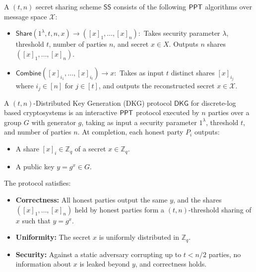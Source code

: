 \begin{definition}
A $(t,n)$ secret sharing scheme $\mathsf{SS}$ consists of the following $\mathsf{PPT}$ algorithms over message space $\mathcal{X}$:
\begin{itemize}
    \item $\mathsf{Share}(1^{\lambda}, t, n, x) \to ([x]_1, \dots, [x]_n):$ Takes security parameter $\lambda$, threshold $t$, number of parties $n$, and secret $x \in X$. Outputs $n$ shares $([x]_1, \dots, [x]_n)$.
    
    \item $\mathsf{Combine}([x]_{i_1}, \dots, [x]_{i_t}) \to x:$ Takes as input $t$ distinct shares $[x]_{i_j}$ where $i_j \in [n]$ for $j \in [t]$, and outputs the reconstructed secret $x \in \mathcal{X}$.
\end{itemize}
\end{definition}




\begin{definition}
A $(t,n)$-Distributed Key Generation (DKG) protocol $\mathsf{DKG}$ for discrete-log based cryptosystems is an interactive $\mathsf{PPT}$ protocol executed by $n$ parties over a group $G$ with generator $g$, taking as input a security parameter $1^\lambda$, threshold $t$, and number of parties $n$. At completion, each honest party $P_i$ outputs:
\begin{itemize}
    \item A share $[x]_i \in \mathbb{Z}_q$ of a secret $x \in \mathbb{Z}_q$.
    \item A public key $y = g^x \in G$.
\end{itemize}
The protocol satisfies:
\begin{itemize}
    \item \textbf{Correctness:} All honest parties output the same $y$, and the shares $([x]_1, \dots, [x]_n)$ held by honest parties form a $(t,n)$-threshold sharing of $x$ such that $y = g^x$.
    \item \textbf{Uniformity:} The secret $x$ is uniformly distributed in $\mathbb{Z}_q$.
    \item \textbf{Security:} Against a static adversary corrupting up to $t < n/2$ parties, no information about $x$ is leaked beyond $y$, and correctness holds.
\end{itemize}
\end{definition}




